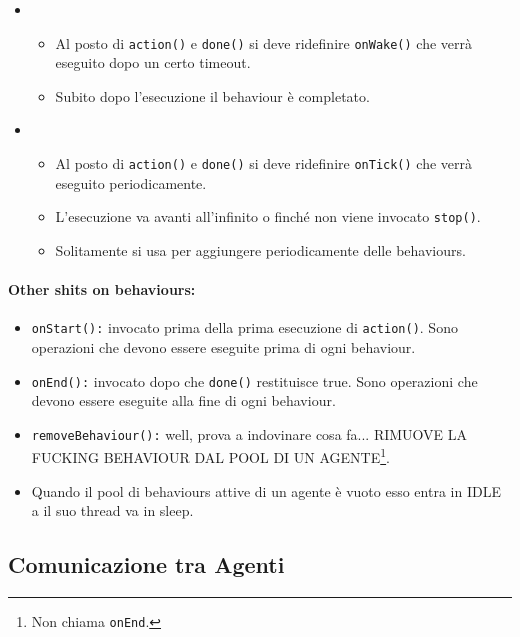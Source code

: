 \begin{itemize}
  \item {}
    \begin{itemize}
      \item Al posto di \texttt{action()} e \texttt{done()} si deve ridefinire \texttt{onWake()} che verrà eseguito dopo un certo timeout. 
      \item Subito dopo l'esecuzione il behaviour è completato.
    \end{itemize}
  \item {}
    \begin{itemize}
      \item Al posto di \texttt{action()} e \texttt{done()} si deve ridefinire \texttt{onTick()} che verrà eseguito periodicamente.
      \item L'esecuzione va avanti all'infinito o finché non viene invocato \texttt{stop()}. 
      \item Solitamente si usa per aggiungere periodicamente delle behaviours.
    \end{itemize}
\end{itemize}

\paragraph{Other shits on behaviours:}

\begin{itemize}
  \item \texttt{onStart():} invocato prima della prima esecuzione di \texttt{action()}. Sono operazioni che devono essere eseguite prima di ogni behaviour.
  \item \texttt{onEnd():} invocato dopo che \texttt{done()} restituisce true. Sono operazioni che devono essere eseguite alla fine di ogni behaviour.
  \item \texttt{removeBehaviour():} well, prova a indovinare cosa fa... RIMUOVE LA FUCKING BEHAVIOUR DAL POOL DI UN AGENTE\footnote{Non chiama \texttt{onEnd}.}. 
  \item Quando il pool di behaviours attive di un agente è vuoto esso entra in IDLE a il suo thread va in sleep.
\end{itemize}

\subsection{Comunicazione tra Agenti}

